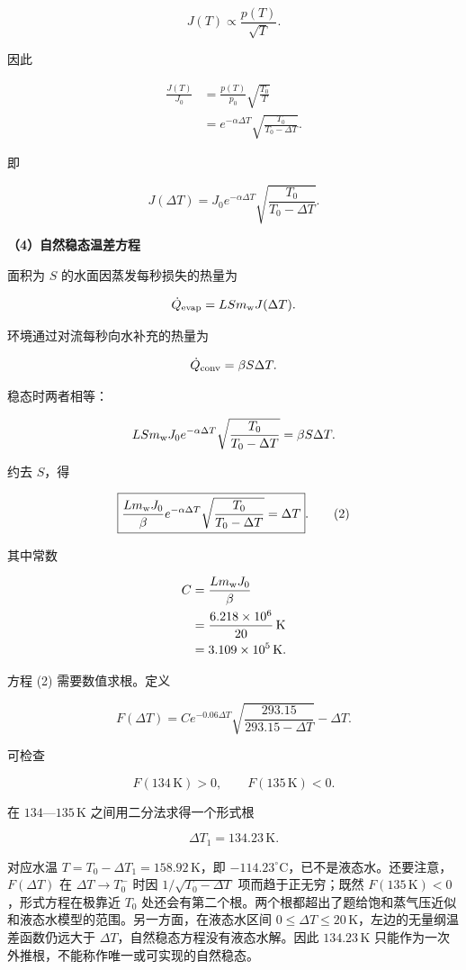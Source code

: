 \documentclass[12pt,a4paper,UTF8]{ctexart}
\begin{document}
\[
J(T)\propto\frac{p(T)}{\sqrt T}.
\]

因此

\[
\begin{aligned}
\frac{J(T)}{J_0}
&=\frac{p(T)}{p_0}
\sqrt{\frac{T_0}{T}}\\
&=e^{-\alpha\Delta T}
\sqrt{\frac{T_0}{T_0-\Delta T}}.
\end{aligned}
\]

即

\[
\boxed{
J(\Delta T)=J_0e^{-\alpha\Delta T}
\sqrt{\frac{T_0}{T_0-\Delta T}}
}. \tag{1}
\]

\textbf{（4）自然稳态温差方程}

面积为 \(S\) 的水面因蒸发每秒损失的热量为

\[
\dot Q_{\rm evap}
=LSm_{\rm w}J(\Delta T).
\]

环境通过对流每秒向水补充的热量为

\[
\dot Q_{\rm conv}=\beta S\Delta T.
\]

稳态时两者相等：

\[
LSm_{\rm w}J_0e^{-\alpha\Delta T}
\sqrt{\frac{T_0}{T_0-\Delta T}}
=\beta S\Delta T.
\]

约去 \(S\)，得

\[
\boxed{
\frac{Lm_{\rm w}J_0}{\beta}
e^{-\alpha\Delta T}
\sqrt{\frac{T_0}{T_0-\Delta T}}
=\Delta T
}. \tag{2}
\]

其中常数

\[
\begin{aligned}
C
&=\frac{Lm_{\rm w}J_0}{\beta}\\
&=\frac{6.218\times10^6}{20}\,\mathrm K\\
&=3.109\times10^5\,\mathrm K.
\end{aligned}
\]

方程 (2) 需要数值求根。定义

\[
F(\Delta T)=
C e^{-0.06\Delta T}
\sqrt{\frac{293.15}{293.15-\Delta T}}
-\Delta T.
\]

可检查

\[
F(134\,\mathrm K)>0,
\qquad
F(135\,\mathrm K)<0.
\]

在 \(134\)---\(135\,\mathrm K\) 之间用二分法求得一个形式根

\[
\boxed{\Delta T_1=134.23\,\mathrm K}.
\]

对应水温 \(T=T_0-\Delta T_1=158.92\,\mathrm K\)，即
\(-114.23^\circ\mathrm C\)，已不是液态水。还要注意，\(F(\Delta T)\) 在
\(\Delta T\to T_0^-\) 时因 \(1/\sqrt{T_0-\Delta T}\)
项而趋于正无穷；既然 \(F(135\,\mathrm K)<0\)，形式方程在极靠近 \(T_0\)
处还会有第二个根。两个根都超出了题给饱和蒸气压近似和液态水模型的范围。另一方面，在液态水区间
\(0\leq\Delta T\leq20\,\mathrm K\)，左边的无量纲温差函数仍远大于
\(\Delta T\)，自然稳态方程没有液态水解。因此 \(134.23\,\mathrm K\)
只能作为一次外推根，不能称作唯一或可实现的自然稳态。
\end{document}
